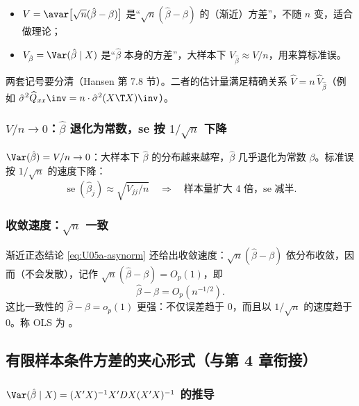 \begin{itemize}
\item $V=\avar\bigl[\sqrt n(\hat\beta-\beta)\bigr]$ 是“$\sqrt n(\hat\beta-\beta)$ 的（渐近）方差”，不随 $n$ 变，适合做理论；
\item $V_{\hat\beta}=\Var(\hat\beta\mid X)$ 是“$\hat\beta$ 本身的方差”，大样本下 $V_{\hat\beta}\approx V/n$，用来算标准误。
\end{itemize}
两套记号要分清（Hansen 第 7.8 节）。二者的估计量满足精确关系 $\widehat V=n\,\widehat V_{\hat\beta}$（例如 $\hat\sigma^2\widehat Q_{xx}\inv=n\cdot\hat\sigma^2(X\T X)\inv$）。

\subsubsection{\texorpdfstring{$V/n\to0$}{V/n -> 0}：\texorpdfstring{$\hat\beta$}{beta-hat} 退化为常数，se 按 \texorpdfstring{$1/\sqrt n$}{1/sqrt(n)} 下降}

$\Var(\hat\beta)=V/n\to0$：大样本下 $\hat\beta$ 的分布越来越窄，$\hat\beta$ 几乎退化为常数 $\beta$。标准误按 $1/\sqrt n$ 的速度下降：
\[
\operatorname{se}(\hat\beta_j)\approx\sqrt{V_{jj}/n}\quad\Rightarrow\quad\text{样本量扩大 4 倍，se 减半}.
\]

\subsubsection{收敛速度：\texorpdfstring{$\sqrt n$}{root-n} 一致}

渐近正态结论 \eqref{eq:U05a-asynorm} 还给出收敛速度：$\sqrt n(\hat\beta-\beta)$ 依分布收敛，因而（不会发散），记作 $\sqrt n(\hat\beta-\beta)=O_p(1)$，即
\[
\hat\beta-\beta=O_p(n^{-1/2}).
\]
这比一致性的 $\hat\beta-\beta=o_p(1)$ 更强：不仅误差趋于 0，而且以 $1/\sqrt n$ 的速度趋于 0。称 OLS 为 。

\subsection{有限样本条件方差的夹心形式（与第 4 章衔接）}

\subsubsection{\texorpdfstring{$\Var(\hat\beta\mid X)=(X'X)^{-1}X'DX(X'X)^{-1}$}{Var(beta-hat|X) sandwich} 的推导}

